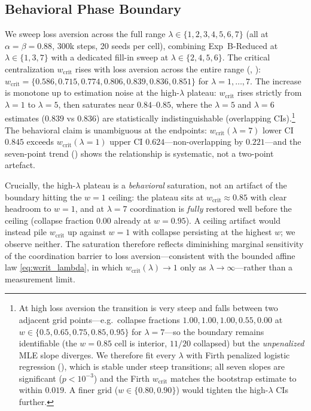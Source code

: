 \documentclass[letterpaper]{article}
\theoremstyle{plain}
\newcommand{\wcrit}{w_{\mathrm{crit}}}
\begin{document}
\subsection{Behavioral Phase Boundary}
\label{sec:results_behavioral}

We sweep loss aversion across the full range $\lambda \in \{1,2,3,4,5,6,7\}$
(all at $\alpha{=}\beta{=}0.88$, 300k steps, 20 seeds per cell), combining
Exp~B-Reduced at $\lambda \in \{1,3,7\}$ with a dedicated fill-in sweep at
$\lambda \in \{2,4,5,6\}$.
The critical centralization $\wcrit$ rises with loss aversion across the entire
range (, ):
$\wcrit = \{0.586, 0.715, 0.774, 0.806, 0.839, 0.836, 0.851\}$ for
$\lambda = 1,\ldots,7$.
The increase is monotone up to estimation noise at the high-$\lambda$ plateau:
$\wcrit$ rises strictly from $\lambda{=}1$ to $\lambda{=}5$, then saturates near
$0.84$--$0.85$, where the $\lambda{=}5$ and $\lambda{=}6$ estimates
($0.839$ vs $0.836$) are statistically indistinguishable (overlapping CIs).\footnote{%
  At high loss aversion the transition is very steep and falls between two
  adjacent grid points---e.g.\ collapse fractions $1.00, 1.00, 1.00, 0.55, 0.00$
  at $w \in \{0.5, 0.65, 0.75, 0.85, 0.95\}$ for $\lambda{=}7$---so the boundary
  remains identifiable (the $w{=}0.85$ cell is interior, $11/20$ collapsed) but
  the \emph{unpenalized} MLE slope diverges. We therefore fit every $\lambda$ with
  Firth penalized logistic regression (), which is stable
  under steep transitions; all seven slopes are significant ($p<10^{-3}$) and the
  Firth $\wcrit$ matches the bootstrap estimate to within $0.019$. A finer grid
  ($w\in\{0.80,0.90\}$) would tighten the high-$\lambda$ CIs further.}
The behavioral claim is unambiguous at the endpoints: $\wcrit(\lambda{=}7)$
lower CI $0.845$ exceeds $\wcrit(\lambda{=}1)$ upper CI $0.624$---non-overlapping
by $0.221$---and the seven-point trend () shows the
relationship is systematic, not a two-point artefact.

Crucially, the high-$\lambda$ plateau is a \emph{behavioral} saturation, not an
artifact of the boundary hitting the $w{=}1$ ceiling: the plateau sits at
$\wcrit\approx0.85$ with clear headroom to $w{=}1$, and at $\lambda{=}7$
coordination is \emph{fully} restored well before the ceiling (collapse fraction
$0.00$ already at $w{=}0.95$). A ceiling artifact would instead pile $\wcrit$ up
against $w{=}1$ with collapse persisting at the highest $w$; we observe neither.
The saturation therefore reflects diminishing marginal sensitivity of the
coordination barrier to loss aversion---consistent with the bounded affine law
\eqref{eq:wcrit_lambda}, in which $\wcrit(\lambda)\to1$ only as
$\lambda\to\infty$---rather than a measurement limit.
\end{document}
